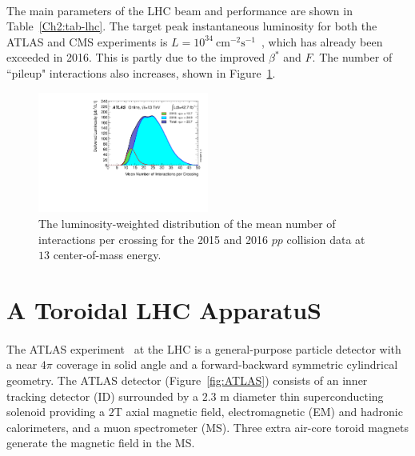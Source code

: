 \paragraph{}
The main parameters of the LHC beam and performance are shown in Table~\ref{Ch2:tab-lhc}. 
The target peak instantaneous luminosity for both the ATLAS and CMS experiments is $L=10^{34}~\text{cm}^{-2}\text{s}^{-1}$~\cite{LHCPaper}, which has already been exceeded in 2016. 
This is partly due to the improved $\beta^*$ and $F$.
The number of ``pileup" interactions also increases, shown in Figure~\ref{fig:Mu_2015_2016}. 

\begin{figure}[htbp!]
  \centering
  \captionsetup{justification=centering}
  \includegraphics[width=0.5\textwidth,angle=-90]{figures/detector/Mu_2015_2016}
   \caption{The luminosity-weighted distribution of the mean number of interactions per crossing for the 2015 and 2016 $pp$ collision data at $13$ \TeV center-of-mass energy.~\cite{Lumi_Run2}}
  \label{fig:Mu_2015_2016}
\end{figure}


\section{A Toroidal LHC ApparatuS}
\label{sec:ATLAS}

\paragraph{}
The ATLAS experiment~\cite{PERF-2007-01} at the LHC is a general-purpose particle detector with a near $4\pi$ coverage in solid angle and a forward-backward symmetric cylindrical geometry. 
The ATLAS detector (Figure~\ref{fig:ATLAS}) consists of an inner tracking detector (ID) surrounded by a $2.3$ m diameter thin superconducting solenoid providing a $2$T axial magnetic field, electromagnetic (EM) and hadronic calorimeters, and a muon spectrometer (MS). Three extra air-core toroid magnets generate the magnetic field in the MS. 

